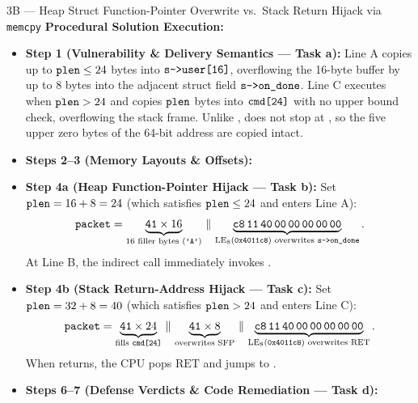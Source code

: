 \begin{templatebox}{3B --- Heap Struct Function-Pointer Overwrite vs.\ Stack Return Hijack via \texttt{memcpy}}
\medskip
\textbf{Procedural Solution Execution:}
\begin{itemize}
  \item \textbf{Step 1 (Vulnerability \& Delivery Semantics --- Task a):}
  Line A copies up to $\texttt{plen} \le 24$ bytes into $\texttt{s->user[16]}$, overflowing the 16-byte buffer by up to 8 bytes into the adjacent struct field $\texttt{s->on\_done}$. Line C executes when $\texttt{plen} > 24$ and copies $\texttt{plen}$ bytes into $\texttt{cmd[24]}$ with no upper bound check, overflowing the stack frame. Unlike ,  does not stop at , so the five upper zero bytes of the 64-bit address  are copied intact.
  \item \textbf{Steps 2--3 (Memory Layouts \& Offsets):}
  \item \textbf{Step 4a (Heap Function-Pointer Hijack --- Task b):}
  Set $\texttt{plen} = 16 + 8 = 24$ (which satisfies $\texttt{plen} \le 24$ and enters Line A):
  \[
    \texttt{packet} = \underbrace{\texttt{41}\times 16}_{\text{16 filler bytes (\texttt{'A'})}} \,\|\, \underbrace{\texttt{c8\,11\,40\,00\,00\,00\,00\,00}}_{\mathrm{LE}_8(\texttt{0x4011c8}) \text{ overwrites \texttt{s->on\_done}}}.
  \]
  At Line B, the indirect call  immediately invokes .
  \item \textbf{Step 4b (Stack Return-Address Hijack --- Task c):}
  Set $\texttt{plen} = 32 + 8 = 40$ (which satisfies $\texttt{plen} > 24$ and enters Line C):
  \[
    \texttt{packet} = \underbrace{\texttt{41}\times 24}_{\text{fills \texttt{cmd[24]}}} \,\|\, \underbrace{\texttt{41}\times 8}_{\text{overwrites SFP}} \,\|\, \underbrace{\texttt{c8\,11\,40\,00\,00\,00\,00\,00}}_{\mathrm{LE}_8(\texttt{0x4011c8}) \text{ overwrites RET}}.
  \]
  When  returns, the CPU pops $\mathrm{RET}$ and jumps to .
  \item \textbf{Steps 6--7 (Defense Verdicts \& Code Remediation --- Task d):}
  \begin{compactitem}

\end{compactitem}
\end{itemize}
\end{templatebox}
